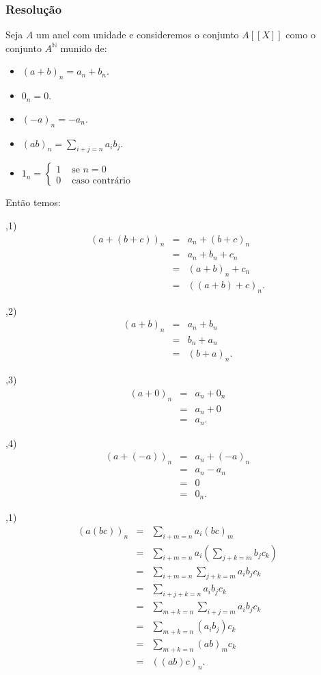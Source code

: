 \documentclass[10pt,a4paper]{article}
\begin{document}
\subsubsection*{Resolução}

Seja $A$ um anel com unidade e consideremos o conjunto $A[[X]]$ como o conjunto $A^\mathbb{N}$ munido de:
\begin{itemize}
\item $(a+b)_n=a_n+b_n$.
\item $0_n=0$.
\item $(-a)_n=-a_n$.
\item $(ab)_n=\sum_{i+j=n}a_ib_j$.
\item $1_n=\left\{\begin{array}{cl}1&\text{ se }n=0\\0&\text{ caso contrário}\end{array}\right.$
\end{itemize}
Então temos:

\smallskip
{},1)
\[
\begin{array}{rcl}
(a+(b+c))_n&=&a_n+(b+c)_n\\&=&a_n+b_n+c_n\\&=&(a+b)_n+c_n\\&=&((a+b)+c)_n.
\end{array}
\]

\smallskip
{},2)
\[
\begin{array}{rcl}
(a+b)_n&=&a_n+b_n\\&=&b_n+a_n\\&=&(b+a)_n.
\end{array}
\]

\smallskip
{},3)
\[
\begin{array}{rcl}
(a+0)_n&=&a_n+0_n\\&=&a_n+0\\&=&a_n.
\end{array}
\]

\smallskip
{},4)
\[
\begin{array}{rcl}
(a+(-a))_n&=&a_n+(-a)_n\\&=&a_n-a_n\\&=&0\\&=&0_n.
\end{array}
\]

\smallskip
{},1)
\[
\begin{array}{rcl}
(a(bc))_n&=&\sum_{i+m=n}a_i(bc)_m\\&=&\sum_{i+m=n}a_i\left(\sum_{j+k=m}b_jc_k\right)\\&=&\sum_{i+m=n}\sum_{j+k=m}a_ib_jc_k\\&=&\sum_{i+j+k=n}a_ib_jc_k\\&=&\sum_{m+k=n}\sum_{i+j=m}a_ib_jc_k\\&=&\sum_{m+k=n}\left(a_ib_j\right)c_k\\&=&\sum_{m+k=n}(ab)_mc_k\\&=&((ab)c)_n.
\end{array}
\]
\end{document}
